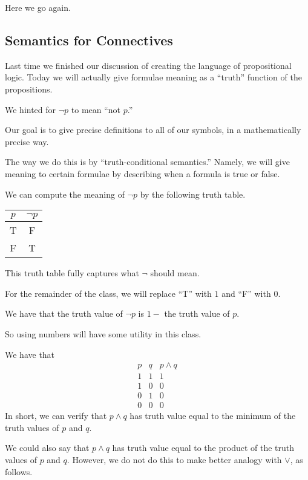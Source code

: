 \documentclass[../notes.tex]{subfiles}
\begin{document}

Here we go again.

\subsection{Semantics for Connectives}
Last time we finished our discussion of creating the language of propositional logic. Today we will actually give formulae meaning as a ``truth'' function of the propositions.
\begin{example}
	We hinted for $\lnot p$ to mean ``not $p$.''
\end{example}
Our goal is to give precise definitions to all of our symbols, in a mathematically precise way.

The way we do this is by ``truth-conditional semantics.'' Namely, we will give meaning to certain formulae by describing when a formula is true or false.
\begin{example}
	We can compute the meaning of $\lnot p$ by the following truth table.
	\begin{center}
		\begin{tabular}{c|c}
			$p$ & $\lnot p$ \\\hline
			T & F \\
			F & T
		\end{tabular}
	\end{center}
	This truth table fully captures what $\lnot$ should mean.
\end{example}
\begin{convention}
	For the remainder of the class, we will replace ``T'' with $1$ and ``F'' with $0$.
\end{convention}
\begin{example}
	We have that the truth value of $\lnot p$ is $1-$ the truth value of $p$.
\end{example}
So using numbers will have some utility in this class.
\begin{example}
	We have that
	\[\begin{array}{c|c||c}
		p & q & p\land q \\\hline
		1 & 1 & 1 \\
		1 & 0 & 0 \\
		0 & 1 & 0 \\
		0 & 0 & 0
	\end{array}\]
	In short, we can verify that $p\land q$ has truth value equal to the minimum of the truth values of $p$ and $q$.
\end{example}
We could also say that $p\land q$ has truth value equal to the product of the truth values of $p$ and $q$. However, we do not do this to make better analogy with $\lor$, as follows.
\end{document}
